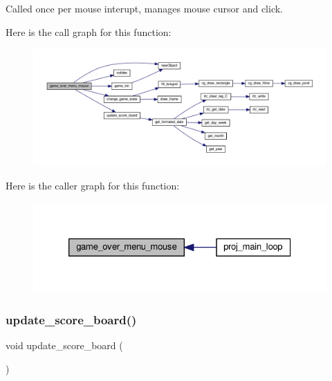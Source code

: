 Called once per mouse interupt, manages mouse cursor and click. 

Here is the call graph for this function\+:
\nopagebreak
\begin{figure}[H]
\begin{center}
\leavevmode
\includegraphics[width=350pt]{group__Game-Over-Menu_gae4cc6accba6062a3b5855bfc3826b215_cgraph}
\end{center}
\end{figure}
Here is the caller graph for this function\+:
\nopagebreak
\begin{figure}[H]
\begin{center}
\leavevmode
\includegraphics[width=326pt]{group__Game-Over-Menu_gae4cc6accba6062a3b5855bfc3826b215_icgraph}
\end{center}
\end{figure}
\mbox{\label{group__Game-Over-Menu_gaacffded003ea0e055b93b3cf2bf26293}} 
\subsubsection{\texorpdfstring{update\+\_\+score\+\_\+board()}{update\_score\_board()}}
{\footnotesize\ttfamily void update\+\_\+score\+\_\+board (\begin{DoxyParamCaption}{ }\end{DoxyParamCaption})}



